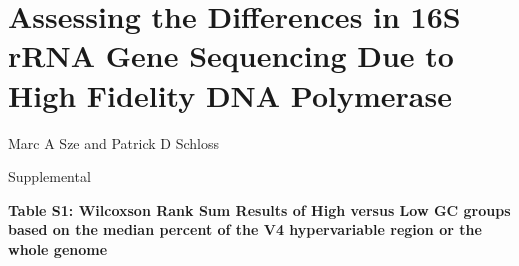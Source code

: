 \documentclass[11pt,]{article}
\title{}
\author{}
\date{}
\begin{document}
\section{Assessing the Differences in 16S rRNA Gene Sequencing Due to
High Fidelity DNA
Polymerase}\label{assessing-the-differences-in-16s-rrna-gene-sequencing-due-to-high-fidelity-dna-polymerase}

\vspace{10mm}

\begin{center}
Marc A Sze and Patrick D Schloss

\vspace{10mm}

Supplemental
\end{center}

\newpage

\textbf{Table S1: Wilcoxson Rank Sum Results of High versus Low GC
groups based on the median percent of the V4 hypervariable region or the
whole genome}
\end{document}
